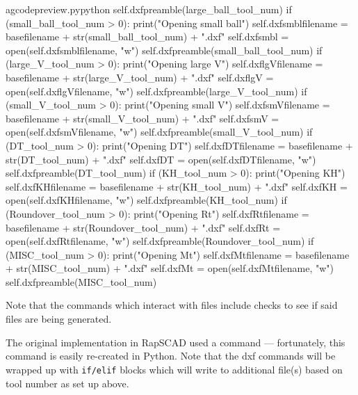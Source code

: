 \documentclass{ltxdoc}
\begin{document}
\begin{writecode}{a}{gcodepreview.py}{python}
                self.dxfpreamble(large_ball_tool_num)
            if (small_ball_tool_num > 0):
                print("Opening small ball")
                self.dxfsmblfilename = basefilename + str(small_ball_tool_num) + ".dxf"
                self.dxfsmbl = open(self.dxfsmblfilename, "w")
                self.dxfpreamble(small_ball_tool_num)
            if (large_V_tool_num > 0):
                print("Opening large V")
                self.dxflgVfilename = basefilename + str(large_V_tool_num) + ".dxf"
                self.dxflgV = open(self.dxflgVfilename, "w")
                self.dxfpreamble(large_V_tool_num)
            if (small_V_tool_num > 0):
                print("Opening small V")
                self.dxfsmVfilename = basefilename + str(small_V_tool_num) + ".dxf"
                self.dxfsmV = open(self.dxfsmVfilename, "w")
                self.dxfpreamble(small_V_tool_num)
            if (DT_tool_num > 0):
                print("Opening DT")
                self.dxfDTfilename = basefilename + str(DT_tool_num) + ".dxf"
                self.dxfDT = open(self.dxfDTfilename, "w")
                self.dxfpreamble(DT_tool_num)
            if (KH_tool_num > 0):
                print("Opening KH")
                self.dxfKHfilename = basefilename + str(KH_tool_num) + ".dxf"
                self.dxfKH = open(self.dxfKHfilename, "w")
                self.dxfpreamble(KH_tool_num)
            if (Roundover_tool_num > 0):
                print("Opening Rt")
                self.dxfRtfilename = basefilename + str(Roundover_tool_num) + ".dxf"
                self.dxfRt = open(self.dxfRtfilename, "w")
                self.dxfpreamble(Roundover_tool_num)
            if (MISC_tool_num > 0):
                print("Opening Mt")
                self.dxfMtfilename = basefilename + str(MISC_tool_num) + ".dxf"
                self.dxfMt = open(self.dxfMtfilename, "w")
                self.dxfpreamble(MISC_tool_num)

\end{writecode}
\addtocounter{gcpy}{88}

Note that the commands which interact with files include checks to see if said files are being generated.
   
The original implementation in {RapSCAD} used a command  --- fortunately, this command is easily re-created in Python. Note that the dxf commands will be wrapped up with \verb|if/elif| blocks which will write to additional file(s) based on tool number as set up above.
\end{document}
